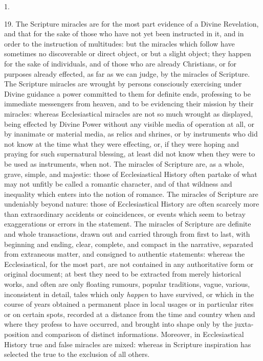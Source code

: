 1.

19.
The Scripture miracles are for the most part evidence of a Divine
Revelation, and that for the sake of those who have not yet been
instructed in it, and in order to the instruction of multitudes: but
the miracles which follow have sometimes no discoverable or
direct object, or but a slight object; they happen for the sake of
individuals, and of those who are already Christians, or for purposes
already effected, as far as we can judge, by the miracles of
Scripture. The Scripture miracles are wrought by persons consciously
exercising under Divine guidance a power committed to them for
definite ends, professing to be immediate messengers from heaven, and
to be evidencing their mission by their miracles: whereas
Ecclesiastical miracles are not so much wrought as displayed, being
effected by Divine Power without any visible media of operation at
all, or by inanimate or material media, as relics and shrines, or by
instruments who did not know at the time what they were effecting, or,
if they were hoping and praying for such supernatural blessing, at
least did not know when they were to be used as instruments, when not.
The miracles of Scripture are, as a whole, grave, simple, and
majestic: those of Ecclesiastical History often partake of what may
not unfitly be called a romantic character, and of that wildness and
inequality which enters into the notion of romance. The miracles of
Scripture are undeniably beyond nature: those of Ecclesiastical
History are often scarcely more than extraordinary accidents or
coincidences, or events which seem to betray exaggerations or errors
in the statement. The miracles of Scripture are definite and whole transactions, drawn out and carried through from first to last,
with beginning and ending, clear, complete, and compact in the
narrative, separated from extraneous matter, and consigned to
authentic statements: whereas the Ecclesiastical, for the most part,
are not contained in any authoritative form or original document; at
best they need to be extracted from merely historical works, and often
are only floating rumours, popular traditions, vague, various,
inconsistent in detail, tales which only \emph{happen} to have
survived, or which in the course of years obtained a permanent place
in local usages or in particular rites or on certain spots, recorded
at a distance from the time and country when and where they profess to
have occurred, and brought into shape only by the juxta-position and
comparison of distinct informations. Moreover, in Ecclesiastical
History true and false miracles are mixed: whereas in Scripture
inspiration has selected the true to the exclusion of all others.

